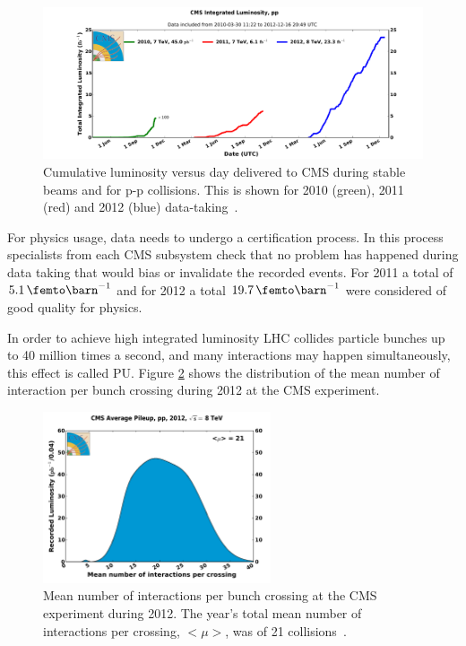 \begin{figure}[!htb]
  \centering
  \includegraphics[width=1.00\textwidth]{Chapter02/CMS/Images/CMS_IntegratedLumi_pp_2010-2012}
  \caption{Cumulative luminosity versus day delivered to CMS during stable beams and for p-p collisions. This is shown for 2010 (green), 2011 (red) and 2012 (blue) data-taking~\cite{IMAGEREF:CMSIntegratedLuminosity}.}
  \label{FIGURE:ExperimentalApparatus_CMS_IntegratedLumi_pp_2010-2012}
\end{figure}

For physics usage, data needs to undergo a certification process. In this process specialists from each \gls{CMS} subsystem check that no problem has happened during data taking that would bias or invalidate the recorded events. For 2011 a total of $5.1\,\femto\barn^{-1}$ and for 2012 a total $19.7\,\femto\barn^{-1}$ were considered of good quality for physics. 

In order to achieve high integrated luminosity \gls{LHC} collides particle bunches up to 40 million times a second, and many interactions may happen simultaneously, this effect is called \gls{PU}. Figure \ref{FIGURE:ExperimentalApparatus_CMS_PileIp_pp_2012} shows the distribution of the mean number of interaction per bunch crossing during 2012 at the \gls{CMS} experiment.

\begin{figure}[!htb]
  \centering
  \includegraphics[width=0.60\textwidth]{Chapter02/CMS/Images/CMS_PileIp_pp_2012}
  \caption{Mean number of interactions per bunch crossing at the CMS experiment during 2012. The year's total mean number of interactions per crossing, $<\mu>$, was of 21 collisions~\cite{IMAGEREF:CMSAveragePileUp2012}.}
  \label{FIGURE:ExperimentalApparatus_CMS_PileIp_pp_2012}
\end{figure}

